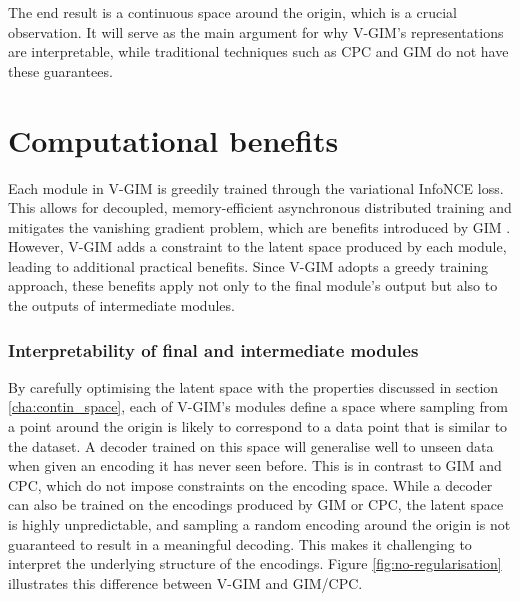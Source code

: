 			The end result is a continuous space around the origin, which is a crucial observation. It will serve as the main argument for why V-GIM's representations are interpretable, while traditional techniques such as CPC and GIM do not have these guarantees. 

		
			


		
\section{Computational benefits}
	Each module in V-GIM is greedily trained through the variational InfoNCE loss. This allows for decoupled, memory-efficient asynchronous distributed training and mitigates the vanishing gradient problem, which are benefits introduced by GIM \cite{lowePuttingEndEndtoEnd2020}. However, V-GIM adds a constraint to the latent space produced by each module, leading to additional practical benefits. Since V-GIM adopts a greedy training approach, these benefits apply not only to the final module's output but also to the outputs of intermediate modules.
	

	\subsubsection{Interpretability of final and intermediate modules}
		By carefully optimising the latent space with the properties discussed in section \ref{cha:contin_space}, each of V-GIM's modules define a space where sampling from a point around the origin is likely to correspond to a data point that is similar to the dataset. A decoder trained on this space will generalise well to unseen data when given an encoding it has never seen before. This is in contrast to GIM and CPC, which do not impose constraints on the encoding space. While a decoder can also be trained on the encodings produced by GIM or CPC, the latent space is highly unpredictable, and sampling a random encoding around the origin is not guaranteed to result in a meaningful decoding. This makes it challenging to interpret the underlying structure of the encodings. Figure \ref{fig:no-regularisation} illustrates this difference between V-GIM and GIM/CPC.
		
	
